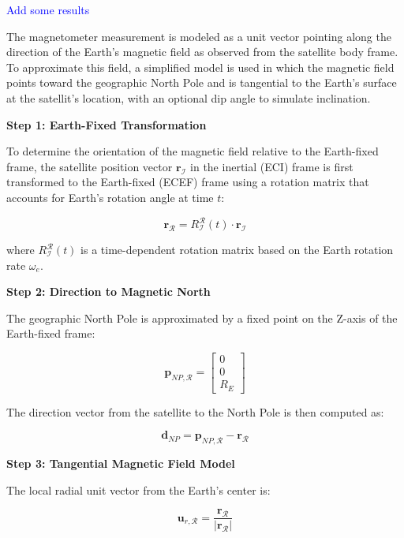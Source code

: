 \textcolor{blue}{Add some results}


The magnetometer measurement is modeled as a unit vector pointing along the direction of the Earth's magnetic field as observed from the satellite body frame. To approximate this field, a simplified model is used in which the magnetic field points toward the geographic North Pole and is tangential to the Earth's surface at the satellit's location, with an optional dip angle to simulate inclination.

\textbf{Step 1: Earth-Fixed Transformation}

To determine the orientation of the magnetic field relative to the Earth-fixed frame, the satellite position vector $\mathbf{r}_{\mathcal{I}}$ in the inertial (ECI) frame is first transformed to the Earth-fixed (ECEF) frame using a rotation matrix that accounts for Earth's rotation angle at time $t$:

\begin{equation}
    \mathbf{r}_{\mathcal{R}} = R_{\mathcal{I}}^{\mathcal{R}}(t) \cdot \mathbf{r}_{\mathcal{I}}
\end{equation}

where $R_{\mathcal{I}}^{\mathcal{R}}(t)$ is a time-dependent rotation matrix based on the Earth rotation rate $\omega_e$.

\textbf{Step 2: Direction to Magnetic North}

The geographic North Pole is approximated by a fixed point on the Z-axis of the Earth-fixed frame:

\begin{equation}
    \mathbf{p}_{NP,\mathcal{R}} = \begin{bmatrix} 0 \\ 0 \\ R_E \end{bmatrix}
\end{equation}

The direction vector from the satellite to the North Pole is then computed as:

\begin{equation}
    \mathbf{d}_{NP} = \mathbf{p}_{NP,\mathcal{R}} - \mathbf{r}_{\mathcal{R}}
\end{equation}

\textbf{Step 3: Tangential Magnetic Field Model}

The local radial unit vector from the Earth's center is:

\begin{equation}
    \mathbf{u}_{r,\mathcal{R}} = \frac{\mathbf{r}_{\mathcal{R}}}{|\mathbf{r}_{\mathcal{R}}|}
\end{equation}

